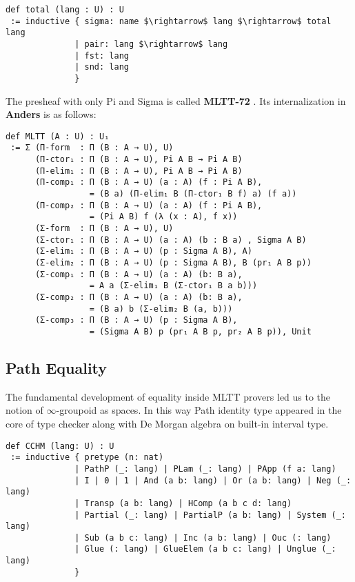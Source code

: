 \documentclass{article}
\begin{document}
\begin{lstlisting}[mathescape=true]
def total (lang : U) : U
 := inductive { sigma: name $\rightarrow$ lang $\rightarrow$ total lang
              | pair: lang $\rightarrow$ lang
              | fst: lang
              | snd: lang
              }
\end{lstlisting}

The presheaf with only Pi and Sigma is called \textbf{MLTT-72} \cite{MLTT72}.
Its internalization in \textbf{Anders} is as follows:

\begin{lstlisting}[mathescape=true]
def MLTT (A : U) : U₁
 := Σ (Π-form  : Π (B : A → U), U)
      (Π-ctor₁ : Π (B : A → U), Pi A B → Pi A B)
      (Π-elim₁ : Π (B : A → U), Pi A B → Pi A B)
      (Π-comp₁ : Π (B : A → U) (a : A) (f : Pi A B),
                 = (B a) (Π-elim₁ B (Π-ctor₁ B f) a) (f a))
      (Π-comp₂ : Π (B : A → U) (a : A) (f : Pi A B),
                 = (Pi A B) f (λ (x : A), f x))
      (Σ-form  : Π (B : A → U), U)
      (Σ-ctor₁ : Π (B : A → U) (a : A) (b : B a) , Sigma A B)
      (Σ-elim₁ : Π (B : A → U) (p : Sigma A B), A)
      (Σ-elim₂ : Π (B : A → U) (p : Sigma A B), B (pr₁ A B p))
      (Σ-comp₁ : Π (B : A → U) (a : A) (b: B a),
                 = A a (Σ-elim₁ B (Σ-ctor₁ B a b)))
      (Σ-comp₂ : Π (B : A → U) (a : A) (b: B a),
                 = (B a) b (Σ-elim₂ B (a, b)))
      (Σ-comp₃ : Π (B : A → U) (p : Sigma A B),
                 = (Sigma A B) p (pr₁ A B p, pr₂ A B p)), Unit
\end{lstlisting}

\newpage
\subsection{Path Equality}

The fundamental development of equality inside MLTT provers led us to the
notion of $\infty$-groupoid as spaces. In this way Path identity type appeared
in the core of type checker along with De Morgan algebra on built-in interval type.

\begin{lstlisting}[mathescape=true]
def CCHM (lang: U) : U
 := inductive { pretype (n: nat)
              | PathP (_: lang) | PLam (_: lang) | PApp (f a: lang)
              | I | 0 | 1 | And (a b: lang) | Or (a b: lang) | Neg (_: lang)
              | Transp (a b: lang) | HComp (a b c d: lang)
              | Partial (_: lang) | PartialP (a b: lang) | System (_: lang)
              | Sub (a b c: lang) | Inc (a b: lang) | Ouc (: lang)
              | Glue (: lang) | GlueElem (a b c: lang) | Unglue (_: lang)
              }
\end{lstlisting}
\end{document}

